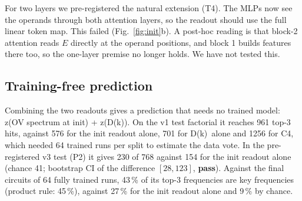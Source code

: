 \documentclass[10pt]{article}
\newcommand{\pass}{\textcolor{green!45!black}{\textbf{pass}}}
\newcommand{\Dk}{D(k)}
\begin{document}
For two layers we pre-registered the natural extension (T4). The MLPs now see the operands through both attention layers,
so the readout should use the full linear token map. This failed (Fig.~\ref{fig:init}b). A post-hoc reading is that block-2
attention reads $E$ directly at the operand positions, and block 1 builds features there too, so the one-layer premise no
longer holds. We have not tested this.

\subsection{Training-free prediction}
Combining the two readouts gives a prediction that needs no trained model: z(OV spectrum at init) + z(\Dk). On the v1 test
factorial it reaches 961 top-3 hits, against 576 for the init readout alone, 701 for \Dk\ alone and 1256 for C4, which
needed 64 trained runs per split to estimate the data vote. In the pre-registered v3 test (P2) it gives 230 of 768 against
154 for the init readout alone (chance 41; bootstrap CI of the difference $[28,123]$, \pass). Against the final circuits
of 64 fully trained runs, 43\,\% of its top-3 frequencies are key frequencies (product rule: 45\,\%), against 27\,\% for
the init readout alone and 9\,\% by chance.
\end{document}
